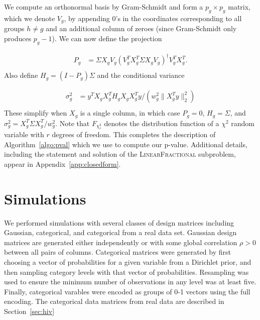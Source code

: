\documentclass{imsart}
\newcommand{\norm}[1]{\lVert #1 \rVert}
\begin{document}
We compute an orthonormal basis by Gram-Schmidt and form a
$p_g \times p_g$ matrix, which we denote $V_g$, by appending
0's in the coordinates corresponding to all groups $h \neq g$ and
an additional column of zeroes (since Gram-Schmidt only produces $p_g-1$).
We can now define the projection

\begin{equation}
 \begin{aligned}
   \label{eq:proj}
   P_g &= \Sigma X_gV_g (V_g^T X_g^T \Sigma X_g V_g)^\dagger V_g^TX_g^T. \\
  \end{aligned}
\end{equation}
Also define $H_g = (I-P_g)\Sigma$ and the conditional variance

\begin{equation}
 \begin{aligned}
   \label{eq:cvar}
   \sigma^2_g &= y^TX_gX_g^T H_g X_gX_g^Ty / (w_g^2 \norm{X_g^Ty}_2^2) \\
 \end{aligned}
\end{equation}
These simplify when $X_g$ is a single column, in which case $P_g = 0$,
$H_g = \Sigma$, and $\sigma^2_g = X_g^T\Sigma X_g^T/w_g^2$.
Note that $F_{\chi^2_r}$ denotes the distribution function of a $\chi^2$
random variable with $r$ degrees of freedom. This completes the
description of Algorithm~\ref{algo:pval} which we use to compute our
p-value. Additional details, including the statement and solution of
the \textsc{LinearFractional} subproblem, appear in Appendix~\ref{app:closedform}.


\section{Simulations}
\label{sec:simulations}

We performed simulations with several classes of design matrices including
Gaussian, categorical, and categorical from a real data set. Gaussian
design matrices are generated either independently or with some global
correlation $\rho > 0$ between all pairs of columns. Categorical matrices
were generated by first choosing a vector of probabilities for a given
variable from a Dirichlet prior, and then sampling category levels with
that vector of probabilities. Resampling was used to ensure the minimum
number of observations in any level was at least five. Finally, categorical
varables were encoded as groups of 0-1 vectors using the full encoding.
The categorical data matrices from real data are described in
Section~\ref{sec:hiv}
\end{document}
